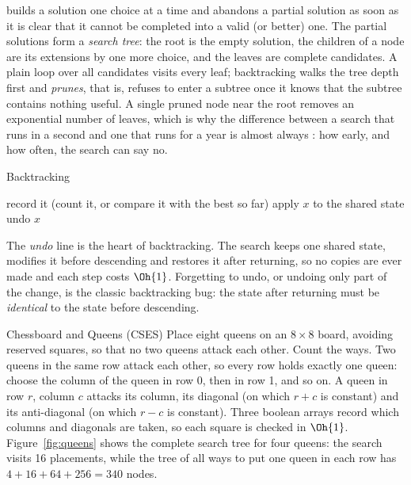  builds a solution one choice at a time and abandons a partial solution as soon as it is clear that it
cannot be completed into a valid (or better) one. The partial solutions form a \emph{search tree}: the root is the empty
solution, the children of a node are its extensions by one more choice, and the leaves are complete candidates. A plain loop
over all candidates visits every leaf; backtracking walks the tree depth first and \emph{prunes}, that is, refuses to enter a
subtree once it knows that the subtree contains nothing useful. A single pruned node near the root removes an exponential
number of leaves, which is why the difference between a search that runs in a second and one that runs for a year is almost
always : how early, and how often, the search can say no.

\begin{pseudo}{Backtracking}
\begin{algorithmic}[1]
    \State record it (count it, or compare it with the best so far)
    \State \Return
  \EndIf
      \State apply $x$ to the shared state 
      \State {}
      \State undo $x$ 
    \EndIf
  \EndFor
\EndProcedure
\end{algorithmic}
\end{pseudo}

The \emph{undo} line is the heart of backtracking. The search keeps one shared state, modifies it before descending and
restores it after returning, so no copies are ever made and each step costs $\Oh{1}$. Forgetting to undo, or undoing only part
of the change, is the classic backtracking bug: the state after returning must be \emph{identical} to the state before
descending.

\begin{problem}{Chessboard and Queens (CSES)}
Place eight queens on an $8 \times 8$ board, avoiding reserved squares, so that no two queens attack each other. Count the
ways.
\solution Two queens in the same row attack each other, so every row holds exactly one queen: choose the column of the
queen in row 0, then in row 1, and so on. A queen in row $r$, column $c$ attacks its column, its diagonal (on which $r + c$ is
constant) and its anti-diagonal (on which $r - c$ is constant). Three boolean arrays record which columns and diagonals are
taken, so each square is checked in $\Oh{1}$. Figure~\ref{fig:queens} shows the complete search tree for four queens: the
search visits 16 placements, while the tree of all ways to put one queen in each row has $4 + 16 + 64 + 256 = 340$ nodes.
\end{problem}

